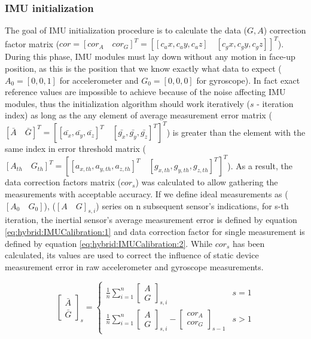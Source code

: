\documentclass[sensors,article,submit,moreauthors,pdftex,10pt,a4paper]{mdpi}
\begin{document}
\subsubsection{IMU initialization}
The goal of IMU initialization procedure is to calculate the data ($G, A$) correction factor matrix ($cor = [cor_A \quad cor_G]^T = [[c_ax,c_ay,c_az ]\quad[c_gx,c_gy,c_gz ]]^T $). During this phase, IMU modules must lay down without any motion in face-up position, as this is the position that we know exactly what data to expect ($A_0=[0,0,1]$ for accelerometer and $G_0=[0,0,0]$ for gyroscope). In fact exact reference values are impossible to achieve because of the noise affecting IMU modules, thus the initialization algorithm should work iteratively ($s$ - iteration index) as long as the any element of average measurement error matrix ($[\bar{A}\quad \bar{G}]^T = [[\bar{a_x},\bar{a_y},\bar{a_z}]^T\quad[\bar{g_x},\bar{g_y},\bar{g_z}]^T]^T$) is greater than the element with the same index in error threshold matrix ($[A_{th}\quad G_{th}]^T = [[a_{x,th},a_{y,th},a_{z,th}]^T\quad[g_{x,th},g_{y,th},g_{z,th}]^T]^T $). As a result, the data correction factors matrix ($cor_s$) was calculated to allow gathering the measurements with acceptable accuracy. If we define ideal measurements as ($[A_0\quad G_0]$), ($[A\quad G]_{s,i}$) series on n subsequent sensor’s indications, for s-th iteration, the inertial sensor’s average measurement error is defined by equation \ref{eq:hybrid:IMUCalibration:1} and data correction factor for single measurement is defined by equation \ref{eq:hybrid:IMUCalibration:2}. While $cor_s$ has been calculated, its values are used to correct the influence of static device measurement error in raw accelerometer and gyroscope measurements.

\begin{equation}
	\begin{bmatrix} \bar{A} \\ \bar{G} \end{bmatrix}_s =
	\begin{cases}
		\frac{1}{n}\sum_{i=1}^{n}{\begin{bmatrix}A \\ G\end{bmatrix}_{s,i}} & s = 1\\
		\frac{1}{n}\sum_{i=1}^{n}{\begin{bmatrix}A \\ G\end{bmatrix}_{s,i} - \begin{bmatrix}cor_A\\ cor_G\end{bmatrix}_{s-1}} &  s > 1
	\end{cases}
	\label{eq:hybrid:IMUCalibration:1}
\end{equation}
\end{document}
